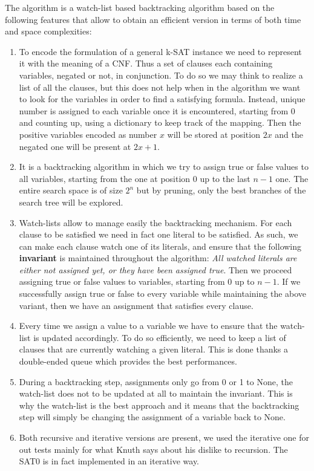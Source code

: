 \documentclass[english]{article}
\begin{document}
				The algorithm is a watch-list based backtracking algorithm based on the following features that allow to obtain an efficient version in terms of both time and space complexities:
				
				\begin{enumerate}[label=(\roman*)]
					\item To encode the formulation of a general k-SAT instance we need to represent it with the meaning of a CNF. Thus a set of clauses each containing variables, negated or not, in conjunction. To do so we may think to realize a list of all the clauses, but this does not help when in the algorithm we want to look for the variables in order to find a satisfying formula. Instead, unique number is assigned to each variable once it is encountered, starting from 0 and counting up, using a dictionary to keep track of the mapping. Then the positive variables encoded as number $x$ will be stored at position $2x$ and the negated one will be present at $2x+1$.
					
					\item It is a backtracking algorithm in which we try to assign true or false values to all variables, starting from the one at position 0 up to the last $n - 1$ one. The entire search space is of size $2^n$ but by pruning, only the best branches of the search tree will be explored.
					
					\item Watch-lists allow to manage easily the backtracking mechanism. For each clause to be satisfied we need in fact one literal to be satisfied. As such, we can make each clause watch one of its literals, and ensure that the following \textbf{invariant} is maintained throughout the algorithm: \emph{All watched literals are either not assigned yet, or they have been assigned true}. Then we proceed assigning true or false values to variables, starting from 0 up to $n-1$. If we successfully assign true or false to every variable while maintaining the above variant, then we have an assignment that satisfies every clause.
					
					\item Every time we assign a value to a variable we have to ensure that the watch-list is updated accordingly. To do so efficiently, we need to keep a list of clauses that are currently watching a given literal. This is done thanks a double-ended queue which provides the best performances.
					
					\item During a backtracking step, assignments only go from 0 or 1 to None, the watch-list does not to be updated at all to maintain the invariant. This is why the watch-list is the best approach and it means that the backtracking step will simply be changing the assignment of a variable back to None.
					
					\item Both recursive and iterative versions are present, we used the iterative one for out tests mainly for what Knuth says about his dislike to recursion. The SAT0 is in fact implemented in an iterative way.
				\end{enumerate}
			
\end{document}
